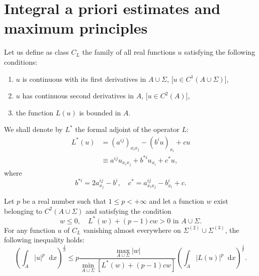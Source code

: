 \documentclass[a4paper,12pt,leqno]{article}
\numberwithin{equation}{section}
\newenvironment{thm}[1]
{\renewcommand\theinnerproblem{#1}\innerproblem}
{\endinnerproblem}
\newcommand{\dd}{\mathop{}\!\mathrm{d}}
\begin{document}
\section{Integral a priori estimates and maximum principles}
\label{sec:3}

Let us define as class $C_{L}$ the family of all real functions $u$ satisfying the following conditions:
\begin{enumerate}[label=\alph*.]
	\item $u$ is continuous with its first derivatives in $A \cup \Sigma$, [$u \in C^{1}(A \cup \Sigma)$],
	\item $u$ has continuous second derivatives in $A$, [$u \in C^{2}(A)$],
	\item the function $L(u)$ is bounded in $A$.
\end{enumerate}
We shall denote by $L^{*}$ the formal adjoint of the operator $L$:
\begin{equation*}
	\begin{aligned}
		L^{*}(u)&=(a^{ij})_{x_i x_{j}}-(b^i u)_{x_i}+c u \\
		&\equiv a^{i j} u_{x_{i} x_{j}}+b^{* i} u_{x_{i}}+c^{*} u,
	\end{aligned}
\end{equation*}
where
\begin{equation*}
	b^{*i} = 2 a^{ij}_{x_j} - b^i,
	\quad
	c^* = a^{ij}_{x_i x_j} - b^i_{x_i} + c.
\end{equation*}

\begin{thm}{I} \label{thm:I}
	Let $p$ be a real number such that $1 \leq p<+\infty$ and let a function $w$ exist belonging to $C^{2}(A \cup \Sigma)$ and satisfying the condition
	\begin{equation}
		\label{eq:3.1}
		w \leq 0, \quad 
		L^{*}(w)+(p-1) c w>0 \text{ in } A \cup \Sigma.
	\end{equation}
	For any function $u$ of $C_{L}$ vanishing almost everywhere on $\Sigma^{(2)} \cup \Sigma^{(3)}$, the following inequality holds:
	\begin{equation}
		\label{eq:3.2}
		\boxed{
		\left(\int_{A}|u|^{p} \dd x\right)^{\frac{1}{p}} \leq p \frac{\max_{A \cup \Sigma}|w|}{\min_{A\cup\Sigma} \left[L^{*}(w)+(p-1) c w\right]}\left(\int_{A}|L(u)|^{p} \dd x\right)^{\frac{1}{p}}.}
	\end{equation}
\end{thm}
\end{document}
